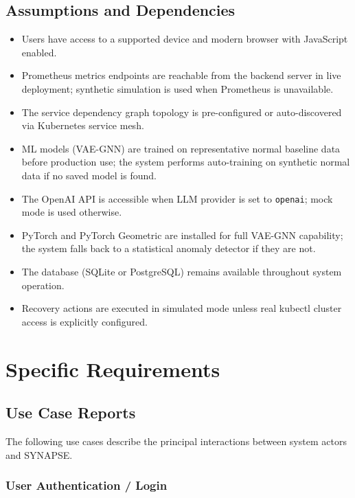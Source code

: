 \documentclass[11pt,a4paper]{article}
\begin{document}
\subsection{Assumptions and Dependencies}

\begin{itemize}
    \item Users have access to a supported device and modern browser with JavaScript enabled.
    \item Prometheus metrics endpoints are reachable from the backend server in live deployment; synthetic simulation is used when Prometheus is unavailable.
    \item The service dependency graph topology is pre-configured or auto-discovered via Kubernetes service mesh.
    \item ML models (VAE-GNN) are trained on representative normal baseline data before production use; the system performs auto-training on synthetic normal data if no saved model is found.
    \item The OpenAI API is accessible when LLM provider is set to \texttt{openai}; mock mode is used otherwise.
    \item PyTorch and PyTorch Geometric are installed for full VAE-GNN capability; the system falls back to a statistical anomaly detector if they are not.
    \item The database (SQLite or PostgreSQL) remains available throughout system operation.
    \item Recovery actions are executed in simulated mode unless real kubectl cluster access is explicitly configured.
\end{itemize}


\FloatBarrier
\section{Specific Requirements}

\subsection{Use Case Reports}

The following use cases describe the principal interactions between system actors and SYNAPSE.

\subsubsection{User Authentication / Login}
\end{document}
